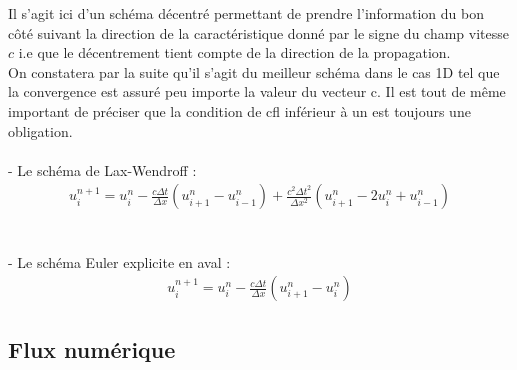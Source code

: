\documentclass[12pt]{article}
\begin{document}
\noindent Il s'agit ici d'un schéma décentré permettant de prendre l'information du bon côté suivant la direction de la caractéristique donné par le signe du champ vitesse $c$ i.e que le décentrement tient compte de la direction de la propagation.
\\On constatera par la suite qu'il s'agit du meilleur schéma dans le cas 1D tel que la convergence est assuré peu importe la valeur du vecteur c. Il est tout de même important de préciser que la condition de cfl inférieur à un est toujours une obligation.
\\
\\- Le schéma de Lax-Wendroff :
\\
\begin{eqnarray*}
        u^{n+1}_i=u_i^n-\frac{c\Delta t}{\Delta x}({u_{i+1}^n-u_{i-1}^n}) +\frac{c^2\Delta t^2}{\Delta x^2}(u_{i+1}^n-2u_{i}^n+u^{n}_{i-1})
\end{eqnarray*}
\\
\\- Le schéma Euler explicite en aval :
\\
\begin{eqnarray*}
        u^{n+1}_i=u_i^n-\frac{c\Delta t}{\Delta x}({u_{i+1}^n-u_{i}^n})
\end{eqnarray*}

\newpage
\subsection{Flux numérique}
\end{document}
